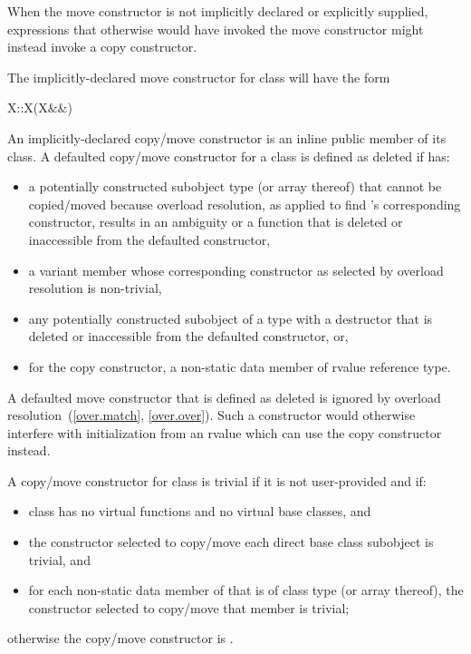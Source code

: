 \begin{note}
When the move constructor is not implicitly declared or explicitly supplied,
expressions that otherwise would have invoked the move constructor might instead invoke
a copy constructor.
\end{note}

\pnum
The implicitly-declared move constructor for class  will have the form
\begin{codeblock}
X::X(X&&)
\end{codeblock}

\pnum
An implicitly-declared copy/move constructor is an
inline public member of its class.
A defaulted copy/\brk{}move constructor for a class
   is defined as deleted if  has:
\begin{itemize}
\item a potentially constructed subobject type
   (or array thereof) that cannot be copied/moved because
  overload resolution, as applied to find
  's
  corresponding constructor, results in an ambiguity or
  a function that is deleted or inaccessible from the
  defaulted constructor,

\item a variant member whose corresponding constructor
  as selected by overload resolution is non-trivial,

\item any potentially constructed subobject of a type
  with a destructor that is deleted or inaccessible from the defaulted
  constructor, or,

\item for the copy constructor, a non-static data member of rvalue reference type.
\end{itemize}

\begin{note}
A defaulted move constructor that is defined as deleted is ignored by overload
resolution~(\ref{over.match}, \ref{over.over}).
Such a constructor would otherwise interfere with initialization from
an rvalue which can use the copy constructor instead.
\end{note}

\pnum
{}%
%
A copy/move constructor for class
is
trivial
if it is not user-provided and if:
\begin{itemize}
\item
class
has no virtual functions
and no virtual base classes, and

\item
the constructor selected to copy/move each direct base class subobject is trivial, and

\item
for each non-static data member of
that is of class type (or array thereof),
the constructor selected to copy/move that member is trivial;
\end{itemize}
%
otherwise the copy/move constructor is
.

